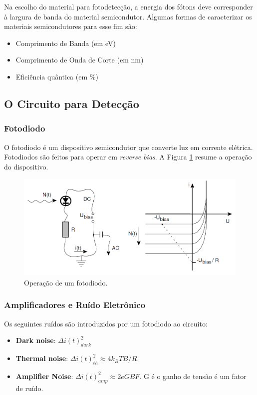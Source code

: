 Na escolho do material para fotodetecção, a energia dos fótons deve corresponder à largura de banda do material semicondutor. Algumas formas de caracterizar os materiais semicondutores para esse fim são:

\begin{itemize}
    \item Comprimento de Banda (em eV)
    \item Comprimento de Onda de Corte (em nm)
    \item Eficiência quântica (em \%)
\end{itemize}

\subsection{O Circuito para Detecção}

\subsubsection{Fotodiodo}

O fotodiodo é um dispositivo semicondutor que converte luz em corrente elétrica. Fotodiodos são feitos para operar em \textit{reverse bias}. A Figura \ref{photodiode} resume a operação do dispositivo.

\begin{figure}[H]
    \centering
    \includegraphics[width=1\linewidth]{photodector.png}
    \caption{Operação de um fotodiodo.}
    \label{photodiode}
\end{figure}

\subsubsection{Amplificadores e Ruído Eletrônico}

Os seguintes ruídos são introduzidos por um fotodiodo ao circuito:

\begin{itemize}
    \item \textbf{Dark noise}: $\Delta i(t)^2_{dark}$
    \item \textbf{Thermal noise}: $\Delta i(t)^2_{th}\approx 4k_BTB/R$.
    \item \textbf{Amplifier Noise}: $\Delta i(t)^2_{amp}\approx 2eGBF$. G é o ganho de tensão é um fator de ruído.
\end{itemize}

